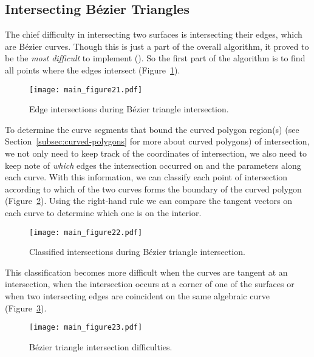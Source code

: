 \documentclass[oneside, reqno]{amsart}
\theoremstyle{definition}
\begin{document}
\subsection{Intersecting B\'{e}zier Triangles}\label{subsec:intersect-bez-tri}

The chief difficulty in intersecting two surfaces is intersecting their edges,
which are B\'{e}zier curves.
Though this is just a part of the overall algorithm, it proved to be the
\emph{most difficult} to implement (\cite{Hermes2017}). So the first part
of the algorithm is to find all points
where the edges intersect (Figure~\ref{fig:edge-intersections}).

\begin{figure}
  \texttt{[image: main\_figure21.pdf]}
  \centering
  \captionsetup{width=.75\linewidth}
  \caption{Edge intersections during B\'{e}zier triangle intersection.}
  \label{fig:edge-intersections}
\end{figure}

To determine the curve segments that bound the curved polygon region(s)
(see Section~\ref{subsec:curved-polygons} for more about curved polygons) of
intersection, we not only need to keep track
of the coordinates of intersection, we also need to keep note of
\emph{which} edges the intersection occurred on and the parameters along
each curve.
With this information, we can classify each point of intersection
according to which of the two curves forms the boundary of the
curved polygon (Figure~\ref{fig:intersection-classification}).
Using the right-hand rule we can compare the tangent
vectors on each curve to determine which one is on the interior.

\begin{figure}
  \texttt{[image: main\_figure22.pdf]}
  \centering
  \captionsetup{width=.75\linewidth}
  \caption{Classified intersections during B\'{e}zier triangle intersection.}
  \label{fig:intersection-classification}
\end{figure}

This classification becomes more difficult when the curves
are tangent at an intersection, when the intersection occurs at a corner
of one of the surfaces or when two intersecting edges are coincident
on the same algebraic curve (Figure~\ref{fig:intersection-difficulties}).

\begin{figure}
  \texttt{[image: main\_figure23.pdf]}
  \centering
  \captionsetup{width=.75\linewidth}
  \caption{B\'{e}zier triangle intersection difficulties.}
  \label{fig:intersection-difficulties}
\end{figure}
\end{document}
